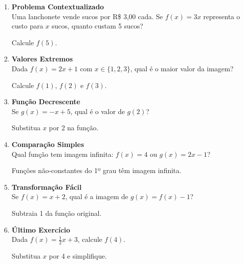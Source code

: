 \documentclass[11pt]{article}
\begin{document}
\begin{multicols}{2}
\begin{enumerate}
\item \textbf{Problema Contextualizado}\\
Uma lanchonete vende sucos por R\$ 3,00 cada. Se \( f(x) = 3x \) representa o custo para \( x \) sucos, quanto custam 5 sucos?
\begin{tcolorbox}[colback=explanationbg,colframe=titleblue,title=Dica:]
Calcule \( f(5) \).
\end{tcolorbox}

\item \textbf{Valores Extremos}\\
Dada \( f(x) = 2x + 1 \) com \( x \in \{1, 2, 3\} \), qual é o maior valor da imagem?
\begin{tcolorbox}[colback=explanationbg,colframe=titleblue,title=Dica:]
Calcule \( f(1) \), \( f(2) \) e \( f(3) \).
\end{tcolorbox}

\item \textbf{Função Decrescente}\\
Se \( g(x) = -x + 5 \), qual é o valor de \( g(2) \)?
\begin{tcolorbox}[colback=explanationbg,colframe=titleblue,title=Dica:]
Substitua \( x \) por 2 na função.
\end{tcolorbox}

\item \textbf{Comparação Simples}\\
Qual função tem imagem infinita: \( f(x) = 4 \) ou \( g(x) = 2x - 1 \)?
\begin{tcolorbox}[colback=explanationbg,colframe=titleblue,title=Dica:]
Funções não-constantes do 1º grau têm imagem infinita.
\end{tcolorbox}

\item \textbf{Transformação Fácil}\\
Se \( f(x) = x + 2 \), qual é a imagem de \( g(x) = f(x) - 1 \)?
\begin{tcolorbox}[colback=explanationbg,colframe=titleblue,title=Dica:]
Subtraia 1 da função original.
\end{tcolorbox}

\item \textbf{Último Exercício}\\
Dada \( f(x) = \frac{1}{2}x + 3 \), calcule \( f(4) \).
\begin{tcolorbox}[colback=explanationbg,colframe=titleblue,title=Dica:]
Substitua \( x \) por 4 e simplifique.
\end{tcolorbox}

\end{enumerate}
\end{multicols}
\end{document}
